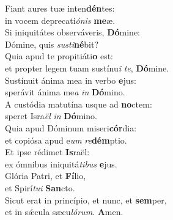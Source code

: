 \evenverse Fiant aures tuæ inten\textbf{dén}tes:~\*\\
\evenverse in vocem deprecati\textit{ó}\textit{nis} \textbf{me}æ.\\
\oddverse Si iniquitátes observáveris, \textbf{Dó}mine:~\*\\
\oddverse Dómine, quis \textit{su}\textit{sti}\textbf{né}bit?\\
\evenverse Quia apud te propitiáti\textbf{o} est:~\*\\
\evenverse et propter legem tuam sustínu\textit{i} \textit{te}, \textbf{Dó}mine.\\
\oddverse Sustínuit ánima mea in verbo \textbf{e}jus:~\*\\
\oddverse sperávit ánima me\textit{a} \textit{in} \textbf{Dó}mino.\\
\evenverse A custódia matutína usque ad \textbf{no}ctem:~\*\\
\evenverse speret Isra\textit{ël} \textit{in} \textbf{Dó}mino.\\
\oddverse Quia apud Dóminum miseri\textbf{cór}dia:~\*\\
\oddverse et copiósa apud e\textit{um} \textit{re}\textbf{dém}ptio.\\
\evenverse Et ipse rédimet \textbf{Is}raël:~\*\\
\evenverse ex ómnibus iniquitá\textit{ti}\textit{bus} \textbf{e}jus.\\
\oddverse Glória Patri, et \textbf{Fí}lio,~\*\\
\oddverse et Spirí\textit{tu}\textit{i} \textbf{San}cto.\\
\evenverse Sicut erat in princípio, et nunc, et \textbf{sem}per,~\*\\
\evenverse et in sǽcula sæcu\textit{ló}\textit{rum}. \textbf{A}men.\\
